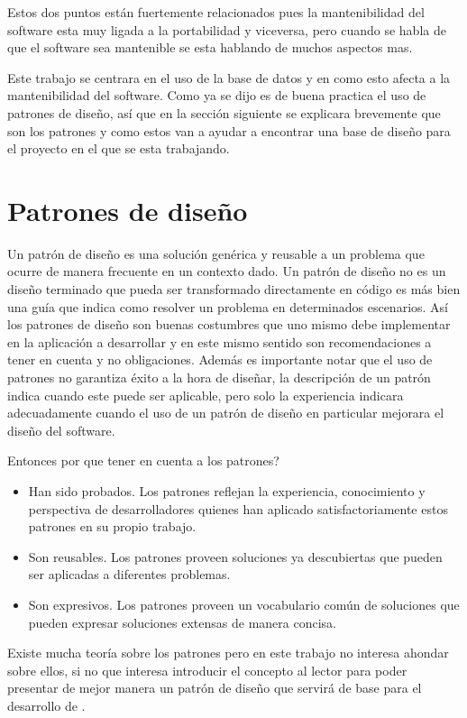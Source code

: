%
Estos dos puntos están fuertemente relacionados pues la mantenibilidad del software esta muy ligada a la portabilidad y viceversa, pero cuando se habla de que el software sea mantenible se esta hablando de muchos aspectos mas.

Este trabajo se centrara en el uso de la base de datos y en como esto afecta a la mantenibilidad del software. Como ya se dijo es de buena practica el uso de patrones de diseño, así que en la sección siguiente  se explicara brevemente que son los patrones y como estos van a ayudar a encontrar una base de diseño para el proyecto en el que se esta trabajando. 
%
%
\section{Patrones de diseño}
%
Un patrón de diseño es una solución genérica y reusable  a un problema que ocurre de manera frecuente en un contexto dado. Un patrón de diseño no es un diseño terminado que pueda ser transformado directamente en código es más bien una guía que indica como resolver un problema en determinados escenarios. Así los patrones de diseño son buenas costumbres que uno mismo debe implementar en la aplicación a desarrollar y en este mismo sentido son recomendaciones a tener en cuenta y no obligaciones\cite{Metsker:2002:DPJ}. Además es importante notar que el uso de patrones no garantiza éxito a la hora de diseñar, la descripción de un patrón indica cuando este puede ser aplicable, pero solo la experiencia indicara adecuadamente cuando el uso de un patrón de diseño en particular mejorara el diseño del software\cite{java:patrones}.

Entonces por que tener en cuenta a los patrones?
\begin{itemize}
\item Han sido probados. Los patrones reflejan la experiencia, conocimiento y perspectiva de desarrolladores quienes han aplicado satisfactoriamente estos patrones en su propio trabajo.
%
\item Son reusables. Los patrones proveen soluciones ya descubiertas que pueden ser aplicadas a diferentes problemas.
%
\item Son expresivos. Los patrones proveen un vocabulario común de soluciones que pueden expresar soluciones extensas de manera concisa.
\end{itemize}

Existe mucha teoría sobre los patrones pero en este trabajo no interesa ahondar sobre ellos, si no que interesa introducir el concepto al lector para poder presentar de mejor manera un patrón de diseño que servirá de base para el desarrollo de \jj.
%
